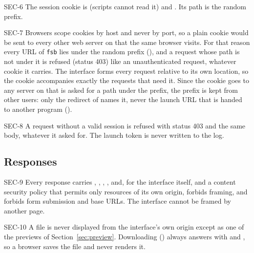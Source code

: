 \begin{req}{SEC-6}
The session cookie is  (scripts cannot read it) and
.  Its path is the random prefix.
\end{req}

\begin{req}{SEC-7}
Browsers scope cookies by host and never by port, so a plain cookie would be sent to
every other web server on  that the same browser visits.  For that
reason every URL of \texttt{fsb} lies under the random prefix (), and
a request whose path is not under it is refused (status 403) like an unauthenticated
request, whatever cookie it carries.  The interface forms every request relative to
its own location, so the cookie accompanies exactly the requests that need it.
Since the cookie goes to any server on  that is asked for a path
under the prefix, the prefix is kept from other users: only the redirect of
 names it, never the launch URL that is handed to another program
().
\end{req}

\begin{req}{SEC-8}
A request without a valid session is refused with status 403 and the same body,
whatever it asked for.  The launch token is never written to the log.
\end{req}

\subsection{Responses}

\begin{req}{SEC-9}
Every response carries ,
, ,
, and, for the interface itself,
 and a content security policy that permits only
resources of its own origin, forbids framing, and forbids form submission and base
URLs.  The interface cannot be framed by another page.
\end{req}

\begin{req}{SEC-10}
A file is never displayed from the interface's own origin except as one of the
previews of Section~\ref{sec:preview}.  Downloading () always answers
with  and
, so a browser saves the file and never
renders it.
\end{req}

